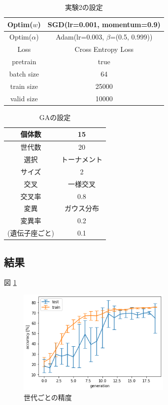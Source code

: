 \documentclass[twocolumn]{jarticle}     %
\begin{document}
\begin{table}[t]
  \begin{center}
    \caption{実験2の設定}
    \begin{tabular}{|c|c|} \hline
      Optim($w$) & SGD(lr=0.001, momentum=0.9) \\ \hline
      Optim($\alpha$) & Adam(lr=0.003, $\beta$=(0.5, 0.999)) \\ \hline
      Loss & Cross Entropy Loss \\ \hline
      pretrain & true \\ \hline
      batch size & 64 \\ \hline
      train size & 25000 \\ \hline
      valid size & 10000 \\ \hline
    \end{tabular}
    \label{tab:setting2}
  \end{center}
\end{table}

\begin{table}[t]
  \begin{center}
    \caption{GAの設定}
    \begin{tabular}{|c|c|} \hline
      個体数 & 15 \\ \hline
      世代数 & 20 \\ \hline \hline
      選択 & トーナメント \\ \hline
      サイズ & 2 \\ \hline \hline
      交叉 & 一様交叉 \\ \hline
      交叉率 & 0.8 \\ \hline \hline
      変異 & ガウス分布 \\ \hline
      変異率 & 0.2 \\
      (遺伝子座ごと) & 0.1 \\ \hline
    \end{tabular}
    \label{tab:setting_ga}
  \end{center}
\end{table}


\subsection{結果}
図 \ref{fig:gene_acc}

\begin{figure}[tb]
  \includegraphics[clip, width=75mm]{acc.png}
  \caption{世代ごとの精度}
  \label{fig:gene_acc}
\end{figure}
\end{document}
